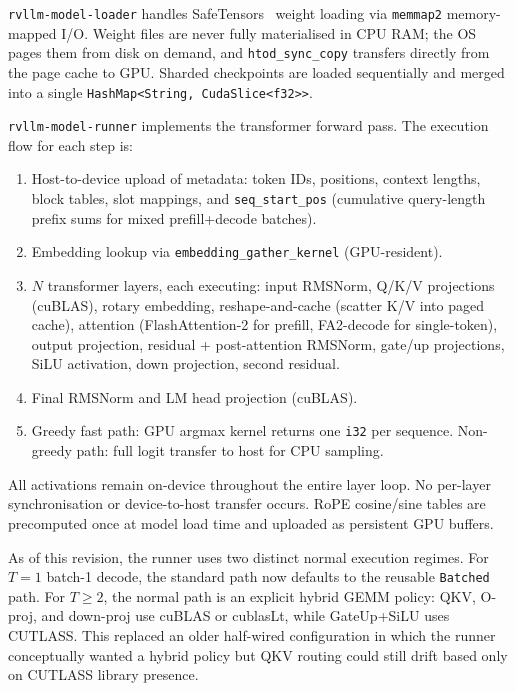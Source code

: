 \texttt{rvllm-model-loader} handles SafeTensors~\cite{safetensors2023} weight loading
via \texttt{memmap2} memory-mapped I/O. Weight files are never fully materialised in
CPU RAM; the OS pages them from disk on demand, and \texttt{htod\_sync\_copy}
transfers directly from the page cache to GPU. Sharded checkpoints are loaded
sequentially and merged into a single \texttt{HashMap<String, CudaSlice<f32>{}>}.

\texttt{rvllm-model-runner} implements the transformer forward pass. The execution
flow for each step is:
\begin{enumerate}
  \item Host-to-device upload of metadata: token IDs, positions, context lengths,
        block tables, slot mappings, and \texttt{seq\_start\_pos} (cumulative
        query-length prefix sums for mixed prefill+decode batches).
  \item Embedding lookup via \texttt{embedding\_gather\_kernel} (GPU-resident).
  \item $N$ transformer layers, each executing: input RMSNorm, Q/K/V projections
        (cuBLAS), rotary embedding, reshape-and-cache (scatter K/V into paged cache),
        attention (FlashAttention-2 for prefill, FA2-decode for single-token), output
        projection, residual + post-attention RMSNorm, gate/up projections,
        SiLU activation, down projection, second residual.
  \item Final RMSNorm and LM head projection (cuBLAS).
  \item Greedy fast path: GPU argmax kernel returns one \texttt{i32} per sequence.
        Non-greedy path: full logit transfer to host for CPU sampling.
\end{enumerate}

All activations remain on-device throughout the entire layer loop. No per-layer
synchronisation or device-to-host transfer occurs. RoPE cosine/sine tables are
precomputed once at model load time and uploaded as persistent GPU buffers.

As of this revision, the runner uses two distinct normal execution regimes. For
$T\!=\!1$ batch-1 decode, the standard path now defaults to the reusable
\texttt{Batched} path. For $T\!\ge\!2$, the normal path is an explicit hybrid
GEMM policy: QKV, O-proj, and down-proj use cuBLAS or cublasLt, while GateUp+SiLU
uses CUTLASS. This replaced an older half-wired configuration in which the runner
conceptually wanted a hybrid policy but QKV routing could still drift based only
on CUTLASS library presence.

